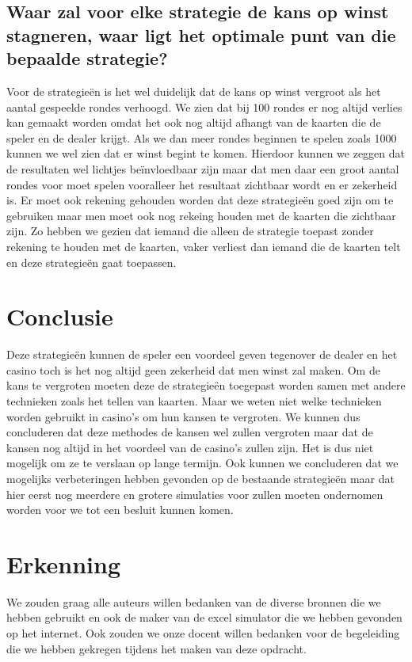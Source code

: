 \documentclass[conference]{IEEEtran}
\begin{document}
\subsection{ Waar zal voor elke strategie de kans op winst stagneren, waar ligt het optimale punt van die bepaalde strategie?}
Voor de strategie\"{e}n is het wel duidelijk dat de kans op winst vergroot als het aantal gespeelde rondes verhoogd. We zien  dat bij 100 rondes er nog altijd verlies kan gemaakt worden omdat het ook nog altijd afhangt van de kaarten die de speler en de dealer krijgt. Als we dan meer rondes beginnen te spelen zoals 1000 kunnen we wel zien dat er winst begint te komen. Hierdoor kunnen we zeggen dat de resultaten wel lichtjes be\"{i}nvloedbaar zijn maar dat men daar een groot aantal rondes voor moet spelen vooralleer het resultaat zichtbaar wordt en er zekerheid is. Er moet ook rekening gehouden worden dat deze strategie\"{e}n goed zijn om te gebruiken maar men moet ook nog rekeing houden met de kaarten die zichtbaar zijn. Zo hebben we gezien dat iemand die alleen de strategie toepast zonder rekening te houden met de kaarten, vaker verliest dan iemand die de kaarten telt en deze strategie\"{e}n gaat toepassen.

\section{Conclusie}
Deze strategie\"{e}n kunnen de speler een voordeel geven tegenover de dealer en het casino toch is het nog altijd geen zekerheid dat men winst zal maken. Om de kans te vergroten moeten deze de strategie\"{e}n toegepast worden samen met andere technieken zoals het tellen van kaarten. Maar we weten niet welke technieken worden gebruikt in casino's om hun kansen te vergroten. We kunnen dus concluderen dat deze methodes de kansen wel zullen vergroten maar dat de kansen nog altijd in het voordeel van de casino's zullen zijn. Het is dus niet mogelijk om ze te verslaan op lange termijn. Ook kunnen we concluderen dat we mogelijks verbeteringen hebben gevonden op de bestaande strategie\"{e}n maar dat hier eerst nog meerdere en grotere simulaties voor zullen moeten ondernomen worden voor we tot een besluit kunnen komen.

\section*{Erkenning}

We zouden graag alle auteurs willen bedanken van de diverse bronnen die we hebben gebruikt en ook de maker van de excel simulator die we hebben gevonden op het internet. Ook zouden we onze docent willen bedanken voor de begeleiding die we hebben gekregen tijdens het maken van deze opdracht.
\nocite{*}



\end{document}
